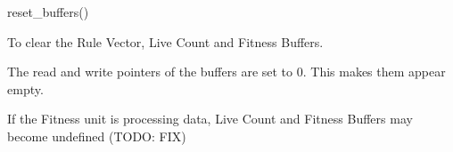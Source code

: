 

\format
reset\_buffers()

\purpose

To clear the Rule Vector, Live Count and Fitness Buffers.

\description

The read and write pointers of the buffers are set to 0.
This makes them appear empty.

\notes

If the Fitness unit is processing data, Live Count and Fitness Buffers may become undefined (TODO: FIX)
